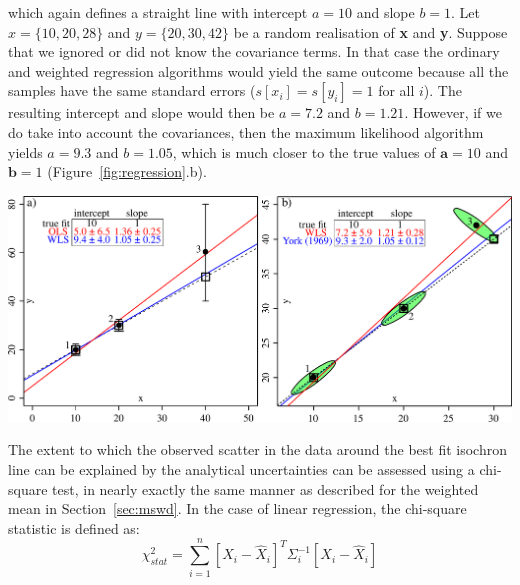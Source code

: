 \begin{refsection}
\noindent which again defines a straight line with intercept $a = 10$
and slope $b = 1$. Let $x = \{10,20,28\}$ and $y = \{20,30,42\}$ be a
random realisation of \textbf{x} and \textbf{y}. Suppose that we
ignored or did not know the covariance terms. In that case the
ordinary and weighted regression algorithms would yield the same
outcome because all the samples have the same standard errors ($s[x_i]
= s[y_i] = 1$ for all $i$). The resulting intercept and slope would
then be $a = 7.2$ and $b = 1.21$. However, if we do take into account
the covariances, then the maximum likelihood algorithm yields $a =
9.3$ and $b = 1.05$, which is much closer to the true values of
$\boldsymbol{a} = 10$ and $\boldsymbol{b} = 1$
(Figure~\ref{fig:regression}.b).

\begin{center}
\noindent\includegraphics[width=.85\textwidth]{../figures/regression.pdf}
\label{fig:regression}
\end{center}

The extent to which the observed scatter in the data around the best
fit isochron line can be explained by the analytical uncertainties can
be assessed using a chi-square test, in nearly exactly the same manner
as described for the weighted mean in Section~\ref{sec:mswd}. In the
case of linear regression, the chi-square statistic is defined as:
\begin{equation}
  \chi_{stat}^2 = \sum\limits_{i=1}^{n} \left[X_i - \hat{X}_i\right]^T
  \Sigma_i^{-1} \left[X_i - \hat{X}_i\right]
  \label{eq:Chi2}
\end{equation}


\end{refsection}
